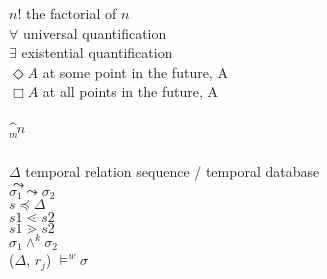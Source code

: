 \begin{symbolindex}
{\begin{tabbing}
 $n!$ \>		the factorial of $n$  \\
 $\forall$ \>		universal quantification  \\
 $\exists$ \>		existential quantification  \\
$\Diamond A$ \>		at some point in the future, A \\	
$\Box A$ \>		at all points in the future, A \\	
 \>		\\
$\bm^n$\>		\\
\diam$^m$ \>		\\
 \>		\\
 $\Delta$ \>		temporal relation sequence / temporal database \\
$\leadsto$ \>		\\
$\sigma_1 \leadsto \sigma_2$ \>		\\
$s \preceq \Delta$  \>		\\
$s1 \lessdot s2$  \>		\\
$s1 \gtrdot s2$  \>		\\
$\sigma_1 \wedge^k \sigma_2$  \>		\\
($\Delta$, $r_j$) $\models^w \sigma$ \>		\\


\end{tabbing}

}


\end{symbolindex}

